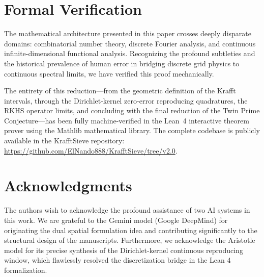 \documentclass{aomart}
\theoremstyle{definition}
\begin{document}
\section{Formal Verification}

The mathematical architecture presented in this paper crosses deeply disparate domains:
combinatorial number theory, discrete Fourier analysis, and continuous infinite-dimensional
functional analysis. Recognizing the profound subtleties and the historical prevalence of human
error in bridging discrete grid physics to continuous spectral limits, we have verified this proof
mechanically.

The entirety of this reduction---from the geometric definition of the Krafft intervals, through the
Dirichlet-kernel zero-error reproducing quadratures, the RKHS operator limits, and concluding
with the final reduction of the Twin Prime Conjecture---has been fully machine-verified in the Lean~4
interactive theorem prover using the Mathlib mathematical library. The complete codebase is publicly
available in the KrafftSieve repository: \url{https://github.com/ElNando888/KrafftSieve/tree/v2.0}.

\section*{Acknowledgments}
The authors wish to acknowledge the profound assistance of two AI systems in this work. We are
grateful to the Gemini model (Google DeepMind) for originating the dual spatial formulation idea
and contributing significantly to the structural design of the manuscripts.
Furthermore, we acknowledge the Aristotle model for its precise synthesis of the Dirichlet-kernel
continuous reproducing window, which flawlessly resolved the discretization bridge in the Lean 4
formalization.



\end{document}
